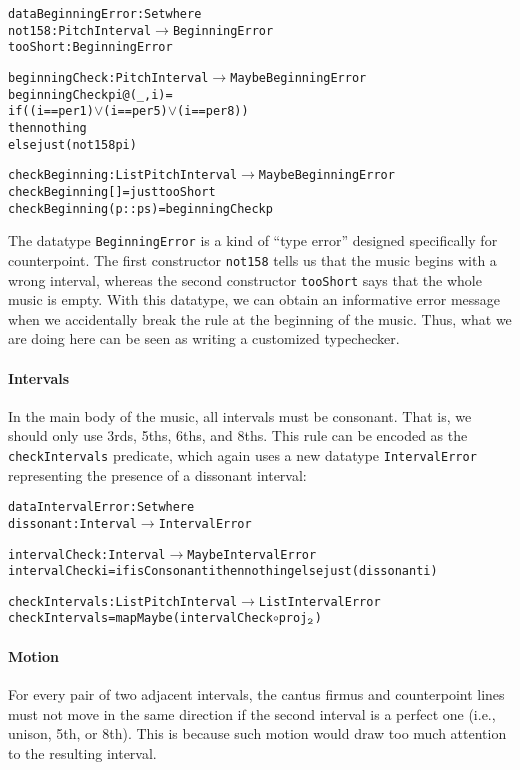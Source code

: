 \begin{alltt}
data BeginningError : Set where
  not158   : PitchInterval \(\rightarrow\) BeginningError
  tooShort : BeginningError
  
beginningCheck : PitchInterval \(\rightarrow\) Maybe BeginningError
beginningCheck pi@(_ , i) =
  if ((i == per1) \(\vee\) (i == per5) \(\vee\) (i == per8))
  then nothing
  else just (not158 pi)

checkBeginning : List PitchInterval \(\rightarrow\) Maybe BeginningError
checkBeginning []       = just tooShort
checkBeginning (p :: ps) = beginningCheck p  
\end{alltt}

\noindent The datatype \texttt{BeginningError} is a kind of
``type error'' designed specifically for counterpoint.
The first constructor \texttt{not158} tells us that the music
begins with a wrong interval, whereas the second constructor
\texttt{tooShort} says that the whole music is empty.
With this datatype, we can obtain an informative error message
when we accidentally break the rule at the beginning of the music.
Thus, what we are doing here can be seen as writing a
customized typechecker.

\paragraph{Intervals}
In the main body of the music, all intervals must be consonant.
That is, we should only use 3rds, 5ths, 6ths, and 8ths.
This rule can be encoded as the \texttt{checkIntervals} predicate,
which again uses a new datatype \texttt{IntervalError} representing
the presence of a dissonant interval:

\begin{alltt}
data IntervalError : Set where
  dissonant : Interval \(\rightarrow\) IntervalError

intervalCheck : Interval \(\rightarrow\) Maybe IntervalError
intervalCheck i = if isConsonant i then nothing else just (dissonant i)

checkIntervals : List PitchInterval \(\rightarrow\) List IntervalError
checkIntervals = mapMaybe (intervalCheck \(\circ\) proj\(\sb{\mathtt{2}}\))
\end{alltt}

\paragraph{Motion}
For every pair of two adjacent intervals, the cantus firmus and
counterpoint lines must not move in the same direction if the second
interval is a perfect one (i.e., unison, 5th, or 8th).
This is because such motion would draw too much attention to the
resulting interval.

